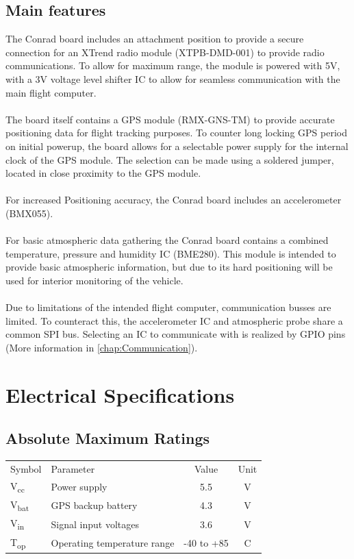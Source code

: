 \documentclass[12pt,article]{memoir}
\begin{document}
\section{Main features}
The Conrad board includes an attachment position to provide a secure connection for an XTrend radio module (XTPB-DMD-001) to provide radio communications. To allow for maximum range, the module is powered with 5V, with a 3V voltage level shifter IC to allow for seamless communication with the main flight computer.\\\\
The board itself contains a GPS module (RMX-GNS-TM) to provide accurate positioning data for flight tracking purposes. To counter long locking GPS period on initial powerup, the board allows for a selectable power supply for the internal clock of the GPS module. The selection can be made using a soldered jumper, located in close proximity to the GPS module.\\\\
For increased Positioning accuracy, the Conrad board includes an accelerometer (BMX055).\\\\
For basic atmospheric data gathering the Conrad board contains a combined temperature, pressure and humidity IC (BME280). This module is intended to provide basic atmospheric information, but due to its hard positioning will be used for interior monitoring of the vehicle.\\\\
Due to limitations of the intended flight computer, communication busses are limited. To counteract this, the accelerometer IC and atmospheric probe share a common SPI bus. Selecting an IC to communicate with is realized by GPIO pins (More information in \autoref{chap:Communication}).\\

\chapter{Electrical Specifications}
\section{Absolute Maximum Ratings}
\begin{tabularx}{\textwidth}{|l|X|c|c|}
	\hline
	Symbol & Parameter & Value  & Unit\\\hhline{|=|=|=|=|}
	V\textsubscript{cc} & Power supply & 5.5 & V\\\hline
	V\textsubscript{bat} & GPS backup battery & 4.3 & V\\\hline
	V\textsubscript{in} & Signal input voltages & 3.6 & V\\\hline
	T\textsubscript{op} & Operating temperature range & -40 to +85 & \textdegree{}C\\\hline
\end{tabularx}
\end{document}
